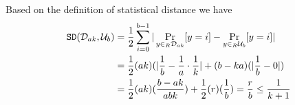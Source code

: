 \begin{remindertheorem}{}  
\thmStatDistTwo
\end{remindertheorem}
\begin{proofof} {}
    ‌Based on the definition of statistical distance we have 
    \begin{align}
        \mathtt{SD}({\mathcal{D}}_{ak}, {\mathcal{U}}_b) &= \frac{1}{2} \sum_{i = 0}^{b-1} |\Pr_{y\in_R {\mathcal{D}}_{ak}}[y = i] - \Pr_{y\in_R {\mathcal{U}}_b}[y = i]| \nonumber\\ 
        & = \frac{1}{2} (ak) (| \frac{1}{b} - \frac{1}{a} \cdot\frac{1}{k}| + (b-ka) (|\frac{1}{b} - 0|)\nonumber\\ 
        & = \frac{1}{2}(ak) (\frac{b-ak}{abk}) + \frac{1}{2}(r)(\frac{1}{b}) = \frac{r}{b} \leq \frac{1}{k+1}
    \end{align}
    
\end{proofof}





